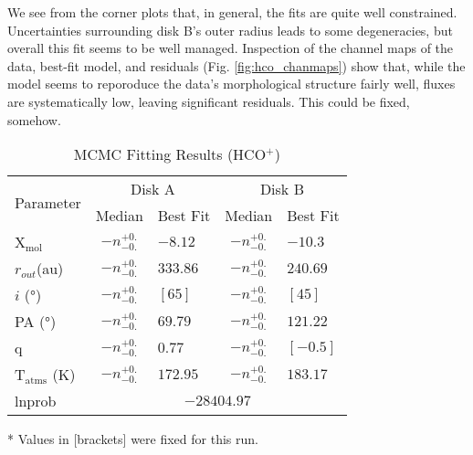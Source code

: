 We see from the corner plots that, in general, the fits are quite well constrained. Uncertainties surrounding disk B's outer radius leads to some degeneracies, but overall this fit seems to be well managed. Inspection of the channel maps of the \hco data, best-fit model, and residuals (Fig. \ref{fig:hco_chanmaps}) show that, while the model seems to reporoduce the data's morphological structure fairly well, fluxes are systematically low, leaving significant residuals. This could be fixed, somehow.

\begin{table}[h!]
  \centering
  \begin{threeparttable}
    \caption{MCMC Fitting Results (HCO$^+$)}
    \label{table:fit_hco}
    \renewcommand{\arraystretch}{1.2}
    \begin{tabular}{l c l c l }
      \toprule \toprule
      \multirow{2}{*}{Parameter} & \multicolumn{2}{c}{Disk A} & \multicolumn{2}{c}{Disk B} \\
                                 & Median & Best Fit          & Median & Best Fit \\
      \midrule %
      X$_\text{mol}$            & $ -n _{-0.} ^{+0.}$ & $-8.12$    & $ -n _{-0.} ^{+0.}$ & $-10.3$ \\
      $r_{out}$(\si{au})        & $ -n _{-0.} ^{+0.}$ & $333.86$    & $ -n _{-0.} ^{+0.}$  & $240.69$    \\
      $i$ (\si{\degree})        & $ -n _{-0.} ^{+0.}$ & $[65]$    & $ -n _{-0.} ^{+0.}$ & $[45]$    \\
      PA  (\si{\degree})        & $ -n _{-0.} ^{+0.}$ & $69.79$  & $ -n _{-0.} ^{+0.}$  & $121.22$  \\
      q                         & $ -n _{-0.} ^{+0.}$ & $0.77$  & $ -n _{-0.} ^{+0.}$  & $[-0.5]$  \\
      T$_\text{atms}$ (\si{\K}) & $ -n _{-0.} ^{+0.}$ & $172.95 $  & $ -n _{-0.} ^{+0.}$  & $183.17$  \\
      lnprob                    & \multicolumn{4}{c}{$-28404.97$} \\
      \bottomrule
    \end{tabular}
    \begin{tablenotes}\footnotesize
      \item[*] Values in [brackets] were fixed for this run.
    \end{tablenotes}
  \end{threeparttable}
\end{table}








